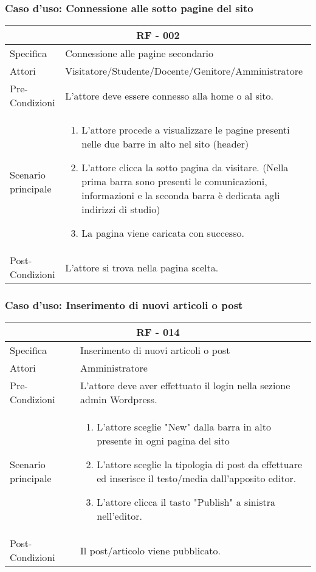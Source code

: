 \documentclass{article}
\begin{document}
\subsubsection{\textbf{Caso d'uso: Connessione alle sotto pagine del sito}}
\begin{tabular}{ |p{3cm}|p{9cm}|  }
	\hline
	\multicolumn{2}{|c|}{\textbf{RF - 002}} \\
	\hline
	Specifica& Connessione alle pagine secondario\\
	\hline
	Attori& Visitatore/Studente/Docente/Genitore/Amministratore\\
	\hline
	Pre-Condizioni& L'attore deve essere connesso alla home o al sito.\\
	\hline
	Scenario principale& \begin{enumerate}
		\item L'attore procede a visualizzare le pagine presenti nelle due barre in alto nel sito (header)
		\item L'attore clicca la sotto pagina da visitare. (Nella prima barra sono presenti le comunicazioni, informazioni e la seconda barra è dedicata agli indirizzi di studio)
		\item La pagina viene caricata con successo.
	\end{enumerate}\\
	\hline
	Post-Condizioni& L'attore si trova nella pagina scelta.\\
	\hline
\end{tabular}
\subsubsection{\textbf{Caso d'uso: Inserimento di nuovi articoli o post}}
\begin{tabular}{ |p{3cm}|p{9cm}|  }
	\hline
	\multicolumn{2}{|c|}{\textbf{RF - 014}} \\
	\hline
	Specifica& Inserimento di nuovi articoli o post\\
	\hline
	Attori& Amministratore\\
	\hline
	Pre-Condizioni& L'attore deve aver effettuato il login nella sezione admin Wordpress.\\
	\hline
	Scenario principale& \begin{enumerate}
		\item L'attore sceglie "New" dalla barra in alto presente in ogni pagina del sito
		\item L'attore sceglie la tipologia di post da effettuare ed inserisce il testo/media dall'apposito editor.
		\item L'attore clicca il tasto "Publish" a sinistra nell'editor.
	\end{enumerate}\\
	\hline
	Post-Condizioni& Il post/articolo viene pubblicato.\\
	\hline
\end{tabular}
\end{document}
